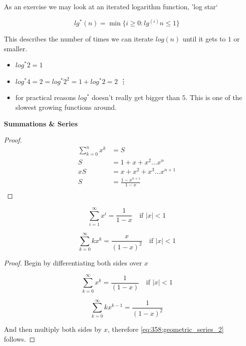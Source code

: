 \documentclass[10pt]{article}
\begin{document}
As an exercise we may look at an iterated logarithm function, 'log star`

\begin{equation}
	lg^*(n) = \min\{ i \ge  0 : lg^{(i)} n \le  1 \}
	\label{eq:358:iterated_logarithm}
\end{equation}

This describes the number of times we can iterate $ log(n) $ until it gets to $ 1 $ or smaller.

\begin{itemize}
	\item $ log^*2 = 1 $ 
	\item $ log^*4 = 2 = log^*2^2 = 1 + log^*2 = 2 $ 
		\vdots
	\item for practical reasons $ log^* $  doesn't really get bigger than $ 5 $. This is one of the slowest growing functions around.
\end{itemize}


\textbf{Summations \& Series} 

\begin{proof}
\begin{equation}
	\begin{split}
		\sum^n_{k=0} x^k &= S \\
		 S &= 1 + x + x^2 \ldots x^n  \\
		 xS &= x + x^2 + x^3 \ldots x^{n+1} \\
		 S &= \frac{1-x^{n+1}}{1-x} \\
	\end{split}
\end{equation}
\end{proof}


\begin{equation}
	\sum^\infty_{i=1} x^i = \frac{1}{1-x} \quad \text{if } |x| < 1
	\label{eq:358:decreasing_geometric_series}
\end{equation}

\begin{equation}
	\sum^\infty_{k=0} kx^k = \frac{x}{(1-x)^2} \quad \text{if } |x| < 1
	\label{eq:358:geometric_series_2}
\end{equation}

\begin{proof}

	Begin by differentiating both sides over $ x $ 

	\begin{equation}
		\sum^\infty_{k=0} x^k = \frac{1}{(1-x)} \quad \text{if } |x| < 1
	\end{equation}

	\begin{equation}
		\sum^{\infty}_{k=0} kx^{k-1} = \frac{1}{(1-x)^2}
	\end{equation}

	And then multiply both sides by $ x $, therefore \eqref{eq:358:geometric_series_2} follows.
\end{proof}
\end{document}
